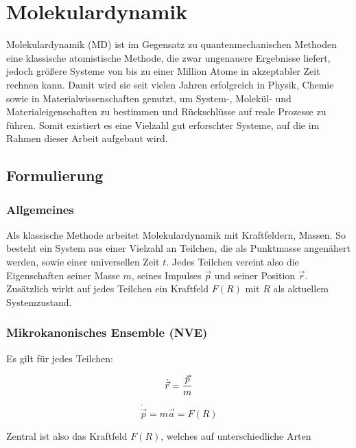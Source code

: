 \section{Molekulardynamik}

Molekulardynamik (MD) ist im Gegensatz zu quantenmechanischen Methoden eine klassische atomistische Methode, die zwar ungenauere Ergebnisse liefert, jedoch größere Systeme von bis zu einer Million Atome in akzeptabler Zeit rechnen kann.
Damit wird sie seit vielen Jahren erfolgreich in Physik, Chemie sowie in Materialwissenschaften genutzt, um System-, Molekül- und Materialeigenschaften zu bestimmen und Rückschlüsse auf reale Prozesse zu führen.
Somit existiert es eine Vielzahl gut erforschter Systeme, auf die im Rahmen dieser Arbeit aufgebaut wird.

\subsection{Formulierung}

\subsubsection{Allgemeines}

Als klassische Methode arbeitet Molekulardynamik mit Kraftfeldern, Massen.
So besteht ein System aus einer Vielzahl an Teilchen, die als Punktmasse angenähert werden, sowie einer universellen Zeit $t$.
Jedes Teilchen vereint also die Eigenschaften seiner Masse $m$, seines Impulses $\vec p$ und seiner Position $\vec r$.
Zusätzlich wirkt auf jedes Teilchen ein Kraftfeld $F(R)$ mit $R$ als aktuellem Systemzustand.

\subsubsection{Mikrokanonisches Ensemble (NVE)}

Es gilt für jedes Teilchen:

\begin{equation}
  \dot{\vec r} = {\vec p \over m}
\end{equation}

\begin{equation}
  \dot{\vec p} = m \vec a = F(R)
\end{equation}


Zentral ist also das Kraftfeld $F(R)$, welches auf unterschiedliche Arten 

